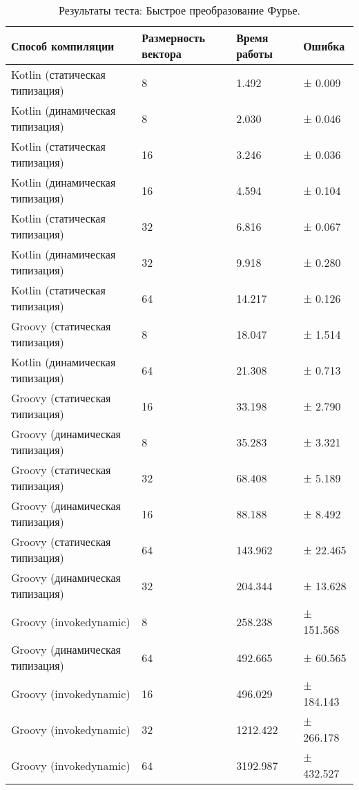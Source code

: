 \begin{table}[h]
\caption{\label{tab:fftResults}Результаты теста: Быстрое преобразование Фурье.}
\begin{center}
\begin{tabular}{|l|p{}|l|l|}
\hline
Способ компиляции & Размерность вектора	& Время работы & Ошибка \\
\hline
Kotlin (статическая типизация)  &  8 &    1.492 & ±   0.009 \\
Kotlin (динамическая типизация) &  8 &    2.030 & ±   0.046 \\
Kotlin (статическая типизация)  & 16 &    3.246 & ±   0.036 \\
Kotlin (динамическая типизация) & 16 &    4.594 & ±   0.104 \\
Kotlin (статическая типизация)  & 32 &    6.816 & ±   0.067 \\
Kotlin (динамическая типизация) & 32 &    9.918 & ±   0.280 \\
Kotlin (статическая типизация)  & 64 &   14.217 & ±   0.126 \\
Groovy (статическая типизация)  &  8 &   18.047 & ±   1.514 \\
Kotlin (динамическая типизация) & 64 &   21.308 & ±   0.713 \\
Groovy (статическая типизация)  & 16 &   33.198 & ±   2.790 \\
Groovy (динамическая типизация) &  8 &   35.283 & ±   3.321 \\
Groovy (статическая типизация)  & 32 &   68.408 & ±   5.189 \\
Groovy (динамическая типизация) & 16 &   88.188 & ±   8.492 \\
Groovy (статическая типизация)  & 64 &  143.962 & ±  22.465 \\
Groovy (динамическая типизация) & 32 &  204.344 & ±  13.628 \\
Groovy (invokedynamic)          &  8 &  258.238 & ± 151.568 \\
Groovy (динамическая типизация) & 64 &  492.665 & ±  60.565 \\
Groovy (invokedynamic)          & 16 &  496.029 & ± 184.143 \\
Groovy (invokedynamic)          & 32 & 1212.422 & ± 266.178 \\
Groovy (invokedynamic)          & 64 & 3192.987 & ± 432.527 \\
\hline
\end{tabular}
\end{center}
\end{table} 

